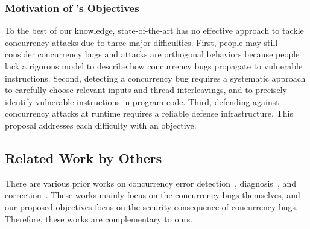 \vspace{-.15in}\subsubsection{Motivation of \xxx's Objectives} 
\label{sec:out-study}\vspace{-.075in}

To the best of our knowledge, state-of-the-art has no effective approach to 
tackle concurrency attacks due to three major difficulties.  First, 
people may still consider concurrency bugs and attacks are orthogonal 
behaviors because people lack a rigorous model to describe how concurrency bugs 
propagate to vulnerable instructions. Second, detecting a concurrency bug 
requires a systematic approach to carefully choose relevant inputs and thread 
interleavings, and to precisely identify vulnerable instructions in program 
code. Third, defending against concurrency attacks at runtime requires a 
reliable defense infrastructure. This proposal addresses each difficulty with 
an objective.





\vspace{-.15in}\subsection{Related Work by Others} 
\label{sec:others-work}\vspace{-.075in}

 There are various prior works on concurrency error 
detection~\cite{yu:racetrack:sosp,savage:eraser,racerx:sosp03,lu:muvi:sosp,
avio:asplos06,conmem:asplos10}, diagnosis~\cite{racefuzzer:pldi08,
ctrigger:asplos09,atomfuzzer:fse08}, 
and correction~\cite{dimmunix:osdi08,gadara:osdi08,wu:loom:osdi10,cfix:osdi12}. 
These works mainly focus on the concurrency bugs themselves, and our
proposed objectives focus on the security consequence of concurrency 
bugs. Therefore, these works are complementary to ours.

